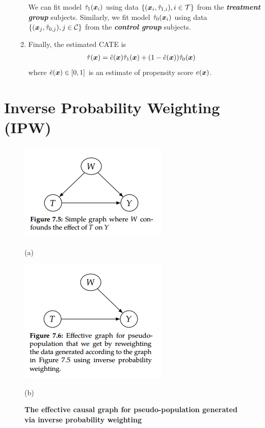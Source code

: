 \documentclass[11pt]{article}
\begin{document}
\begin{itemize}
\begin{enumerate}

We can fit model $\hat{\tau}_1(\boldsymbol{x}_i)$ using data $\left\{(\boldsymbol{x}_{i}, \hat{\tau}_{1,i}), i\in {\mathcal T}\right\}$ from the \textbf{\emph{treatment group}} subjects. Similarly, we fit model $\hat{\tau}_{0}(\boldsymbol{x}_i)$  using data $\left\{(\boldsymbol{x}_{j}, \hat{\tau}_{0,j}), j \in  {\mathcal C}\right\}$  from the  \textbf{\emph{control group}} subjects.

\item Finally, the estimated CATE is
\begin{align}
\hat{\tau}(\boldsymbol{x}) &= \hat{e}(\boldsymbol{x}) \hat{\tau}_1(\boldsymbol{x}) + (1 - \hat{e}(\boldsymbol{x})) \hat{\tau}_{0}(\boldsymbol{x}) \label{eqn: x_learner_ate}
\end{align} where $\hat{e}(\boldsymbol{x}) \in [0, 1]$ is an estimate of propensity score $e(\boldsymbol{x})$.
\end{enumerate}
\end{itemize}
\section{Inverse Probability Weighting (IPW)}
\begin{figure}
\begin{minipage}[t]{0.5\linewidth}
  \centering
  \centerline{\includegraphics[scale = 0.6]{IPW_1.png}}
  \vspace{-5pt}
  \centerline{(a)}
\end{minipage}
\begin{minipage}[t]{0.5\linewidth}
  \centering
  \centerline{\includegraphics[scale = 0.6]{IPW_2.png}}
  \vspace{-5pt}
  \centerline{(b)}
\end{minipage}
\caption{\footnotesize{\textbf{The effective causal graph for pseudo-population generated via inverse probability weighting}}}
\label{fig: ipw}
\end{figure}
\end{document}
